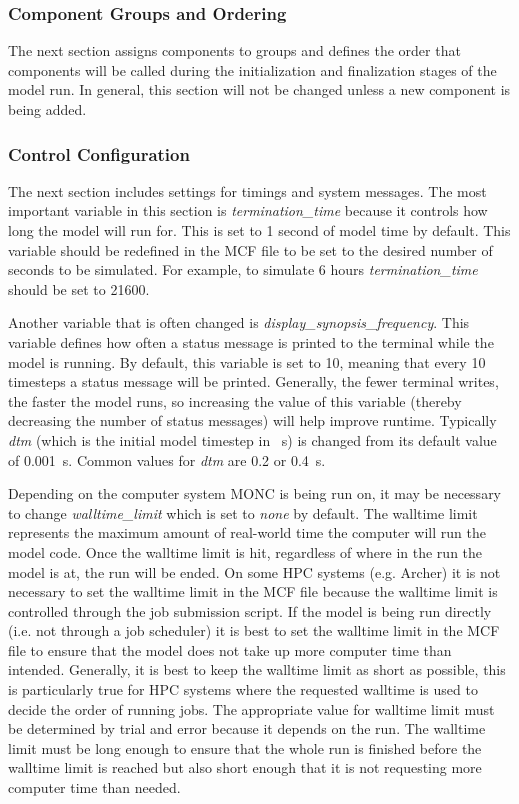 \subsubsection{Component Groups and Ordering}
The next section assigns components to groups and defines the order that components will be called during the initialization and finalization stages of the model run. In general, this section will not be changed unless a new component is being added. \citep{moncCode}

\subsubsection{Control Configuration}
The next section includes settings for timings and system messages. The most important variable in this section is \textit{termination\_time} because it controls how long the model will run for. This is set to 1 second of model time by default. This variable should be redefined in the MCF file to be set to the desired number of seconds to be simulated. For example, to simulate 6 hours \textit{termination\_time} should be set to 21600. \citep{moncCode}

Another variable that is often changed is \textit{display\_synopsis\_frequency}. This variable defines how often a status message is printed to the terminal while the model is running. By default, this variable is set to 10, meaning that every 10 timesteps a status message will be printed. Generally, the fewer terminal writes, the faster the model runs, so increasing the value of this variable (thereby decreasing the number of status messages) will help improve runtime. Typically \textit{dtm} (which is the initial model timestep in \SI{}{s}) is changed from its default value of \SI{0.001}{s}. Common values for \textit{dtm} are 0.2 or \SI{0.4}{s}. \citep{moncCode}

Depending on the computer system MONC is being run on, it may be necessary to change \textit{walltime\_limit} which is set to \textit{none} by default. The walltime limit represents the maximum amount of real-world time the computer will run the model code. Once the walltime limit is hit, regardless of where in the run the model is at, the run will be ended. On some HPC systems (e.g. Archer) it is not necessary to set the walltime limit in the MCF file because the walltime limit is controlled through the job submission script. If the model is being run directly (i.e. not through a job scheduler) it is best to set the walltime limit in the MCF file to ensure that the model does not take up more computer time than intended. Generally, it is best to keep the walltime limit as short as possible, this is particularly true for HPC systems where the requested walltime is used to decide the order of running jobs. The appropriate value for walltime limit must be determined by trial and error because it depends on the run. The walltime limit must be long enough to ensure that the whole run is finished before the walltime limit is reached but also short enough that it is not requesting more computer time than needed.

